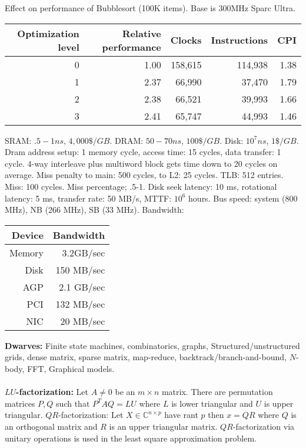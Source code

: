 Effect on performance of Bubblesort (100K items).  Base is 300MHz Sparc Ultra.
\begin{center}
\begin{tabular} {|r|r|r|r|r|}
\hline
{\bf Optimization level} & {\bf Relative performance} & {\bf Clocks} & {\bf Instructions} & {\bf CPI}\\
\hline
0 & 1.00 & 158,615 & 114,938 & 1.38 \\
1 & 2.37 & 66,990  & 37,470 & 1.79 \\
2 & 2.38 & 66,521 & 39,993 & 1.66 \\
3 & 2.41 & 65,747 & 44,993 & 1.46\\
\hline
\end{tabular}
\end{center}
SRAM: $.5-1 ns$, $4,000 \$/GB$.
DRAM: $50-70 ns$, $100 \$/GB$.
Disk: $10^7 ns$, $1 \$/GB$.  
Dram address setup: 1 memory cycle, access time: 15 cycles, data transfer: 1 cycle.
4-way interleave plus multiword block gets time down to 20 cycles on average.
Miss penalty to main: 500 cycles, to L2: 25 cycles.  TLB: 512 entries.  Miss: 100 cycles.
Miss percentage; .5-1.
Disk seek latency: 10 ms, rotational latency: 5 ms, transfer rate: 50 MB/s, MTTF:
$10^6$ hours.  Bus speed: system (800 MHz), NB (266 MHz), SB (33 MHz).  Bandwidth:
\begin{center}
\begin{tabular} {|r|r|}
\hline
{\bf Device} & {\bf Bandwidth} \\
\hline
Memory & 3.2GB/sec \\
Disk & 150 MB/sec\\
AGP & 2.1 GB/sec\\
PCI& 132 MB/sec\\
NIC & 20 MB/sec\\
\hline
\end{tabular}
\end{center}
{\bf Dwarves:}
Finite state machines, combinatorics, graphs, Structured/unstructured grids, dense matrix, sparse
matrix, map-reduce, backtrack/branch-and-bound, $N$-body, FFT, Graphical models.\\
\\
$LU${\bf-factorization:}  Let $A \ne 0$ be an $m \times n$ matrix.  There are permutation matrices
$P,Q$ such that $P^T A Q= LU$ where $L$ is lower triangular and $U$ is upper triangular.
$QR$-factorization: Let $X \in {\mathbb C}^{n \times p}$ have rant $p$ then
$x= QR$ where $Q$ is an orthogonal matrix and $R$ is an upper triangular matrix.  
$QR$-factorization via unitary operations is used in the least square approximation problem.
